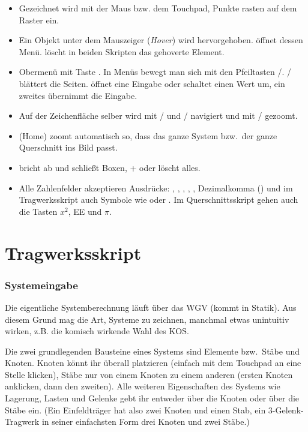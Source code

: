 \begin{itemize}
  \item Gezeichnet wird mit der Maus bzw. dem Touchpad, Punkte rasten auf dem Raster ein.
  \item Ein Objekt unter dem Mauszeiger (\emph{Hover}) wird hervorgehoben.  öffnet
        dessen Menü.  löscht in beiden Skripten das gehoverte Element.
  \item Obermenü mit Taste . In Menüs bewegt man sich mit den Pfeiltasten \taste{$\uparrow$}/\taste{$\downarrow$}.
        \taste{$\leftarrow$}/\taste{$\rightarrow$} blättert die Seiten.  öffnet eine
        Eingabe oder schaltet einen Wert um, ein zweites  übernimmt die Eingabe.
  \item Auf der Zeichenfläche selber wird mit \taste{$\uparrow$}/\taste{$\downarrow$} und
        \taste{$\leftarrow$}/\taste{$\rightarrow$} navigiert und mit \taste{+}/\taste{-} gezoomt.
  \item {} (Home) zoomt automatisch so, dass das ganze System bzw.\ der ganze Querschnitt
        ins Bild passt.
  \item {} bricht ab und schließt Boxen, + oder  löscht alles.
  \item Alle Zahlenfelder akzeptieren Ausdrücke: , , ,
        , , Dezimalkomma () und im Tragwerksskript auch
        Symbole wie  oder . Im Querschnittsskript gehen auch die Tasten
        $x^2$, \textsf{EE} und $\pi$.
\end{itemize}

\part{Tragwerksskript}

\section{Systemeingabe}

Die eigentliche Systemberechnung läuft über das WGV (kommt in Statik). Aus diesem Grund mag die
Art, Systeme zu zeichnen, manchmal etwas unintuitiv wirken, z.B. die komisch wirkende Wahl des KOS.

Die zwei grundlegenden Bausteine eines Systems sind Elemente bzw.\ Stäbe und Knoten. Knoten könnt
ihr überall platzieren (einfach mit dem Touchpad an eine Stelle klicken), Stäbe nur von einem
Knoten zu einem anderen (ersten Knoten anklicken, dann den zweiten). Alle weiteren Eigenschaften
des Systems wie Lagerung, Lasten und Gelenke gebt ihr entweder über die Knoten oder über die Stäbe
ein. (Ein Einfeldträger hat also zwei Knoten und einen Stab, ein 3-Gelenk-Tragwerk in seiner
einfachsten Form drei Knoten und zwei Stäbe.)


